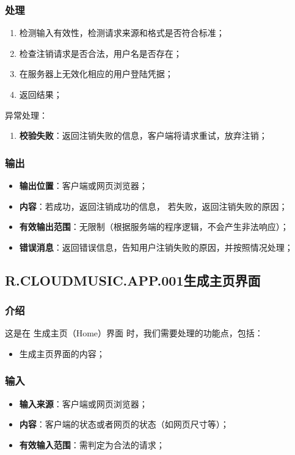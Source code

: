 \subsubsection{处理}
	\begin{enumerate}
		\item 检测输入有效性，检测请求来源和格式是否符合标准；
		\item 检查注销请求是否合法，用户名是否存在；
		\item 在服务器上无效化相应的用户登陆凭据；
		\item 返回结果；
	\end{enumerate}
	\noindent 异常处理：
	\begin{enumerate}
		\item \textbf{校验失败}：返回注销失败的信息，客户端将请求重试，放弃注销；
	\end{enumerate}
\subsubsection{输出}
\begin{itemize}
	\item \textbf{输出位置}：客户端或网页浏览器；
	\item \textbf{内容}：若成功，返回注销成功的信息，
		若失败，返回注销失败的原因；
	\item \textbf{有效输出范围}：无限制（根据服务端的程序逻辑，不会产生非法响应）；
	\item \textbf{错误消息}：返回错误信息，告知用户注销失败的原因，并按照情况处理；
\end{itemize}

\subsection{R.CLOUDMUSIC.APP.001生成主页界面}
\subsubsection{介绍}
	这是在 生成主页（Home）界面 时，我们需要处理的功能点，包括：
	\begin{itemize}
		\item 生成主页界面的内容；
	\end{itemize}
\subsubsection{输入}
	\begin{itemize}
		\item \textbf{输入来源}：客户端或网页浏览器；
		\item \textbf{内容}：客户端的状态或者网页的状态（如网页尺寸等）；
		\item \textbf{有效输入范围}：需判定为合法的请求；
	\end{itemize}
